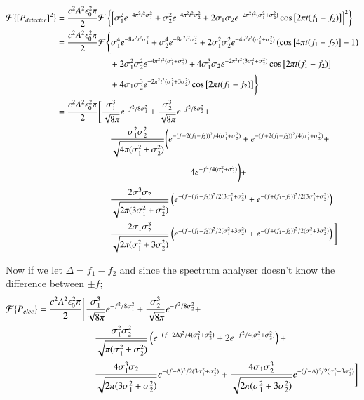 \begin{align}
\mathcal{F}\{\left[P_{detector}\right]^2\} &= \frac{c^2A^2\epsilon_0^2 \pi}{2}\mathcal{F}\left\{\left[\sigma_1^2 e^{-4\pi^2t^2\sigma_1^2} + \sigma_2^2 e^{-4\pi^2t^2\sigma_2^2} + 2\sigma_1\sigma_2 e^{-2\pi^2t^2(\sigma_1^2+\sigma_2^2)}\cos\big[2\pi t (f_1-f_2)\big] \right]^2\right\}\notag\\
&= \frac{c^2A^2\epsilon_0^2 \pi}{2}\mathcal{F}\Bigg\{\sigma_1^4 e^{-8\pi^2t^2\sigma_1^2} + \sigma_2^4 e^{-8\pi^2t^2\sigma_2^2} + 2\sigma_1^2\sigma_2^2 e^{-4\pi^2t^2(\sigma_1^2+\sigma_2^2)}\left(\cos\big[4\pi t (f_1-f_2)\big]+1\right)\notag\\
&\quad\quad\quad\quad\quad\quad + 2\sigma_1^2\sigma_2^2 e^{-4\pi^2t^2(\sigma_1^2+\sigma_2^2)} + 4\sigma_1^3\sigma_2 e^{-2\pi^2t^2(3\sigma_1^2+\sigma_2^2)}\cos\big[2\pi t (f_1-f_2)\big] \notag\\
&\quad\quad\quad\quad\quad\quad + 4\sigma_1\sigma_2^3e^{-2\pi^2t^2(\sigma_1^2+3\sigma_2^2)}\cos\big[2\pi t (f_1-f_2)\big] \Bigg\}\notag\\
&= \frac{c^2A^2\epsilon_0^2 \pi}{2}\Bigg[\frac{\sigma_1^3}{\sqrt{8\pi}} e^{-f^2/8\sigma_1^2} + \frac{\sigma_2^3}{\sqrt{8\pi}} e^{-f^2/8\sigma_2^2} + \notag\\
&\quad\quad\quad\quad\quad\quad \frac{\sigma_1^2\sigma_2^2}{\sqrt{4\pi(\sigma_1^2+\sigma_2^2)}}\Bigg(e^{-(f-2(f_1-f_2))^2/4(\sigma_1^2+\sigma_2^2)} + e^{-(f+2(f_1-f_2))^2/4(\sigma_1^2+\sigma_2^2)}+\notag\\
&\quad\quad\quad\quad\quad\quad  \quad\quad\quad\quad\quad\quad\quad\quad\quad 4e^{-f^2/4(\sigma_1^2+\sigma_2^2)} \Bigg) +\notag\\
&\quad\quad\quad\quad\quad\quad  \frac{2\sigma_1^3\sigma_2}{\sqrt{2\pi(3\sigma_1^2+\sigma_2^2)}}\left(e^{-(f-(f_1-f_2))^2/2(3\sigma_1^2+\sigma_2^2)}+e^{-(f+(f_1-f_2))^2/2(3\sigma_1^2+\sigma_2^2)}\right)\notag\\
&\quad\quad\quad\quad\quad\quad  \frac{2\sigma_1\sigma_2^3}{\sqrt{2\pi(\sigma_1^2+3\sigma_2^2)}}\left(e^{-(f-(f_1-f_2))^2/2(\sigma_1^2+3\sigma_2^2)}+e^{-(f+(f_1-f_2))^2/2(\sigma_1^2+3\sigma_2^2)}\right)\Bigg]
\end{align}

Now if we let $\Delta=f_1-f_2$ and since the spectrum analyser doesn't know the difference between $\pm f$;
\begin{align}
\mathcal{F}\{P_{elec}\} &= \frac{c^2A^2\epsilon_0^2 \pi}{2}\Bigg[\frac{\sigma_1^3}{\sqrt{8\pi}} e^{-f^2/8\sigma_1^2} + \frac{\sigma_2^3}{\sqrt{8\pi}} e^{-f^2/8\sigma_2^2} + \notag\\
&\quad\quad\quad\quad\quad\quad \frac{\sigma_1^2\sigma_2^2}{\sqrt{\pi(\sigma_1^2+\sigma_2^2)}}\left(e^{-(f-2\Delta)^2/4(\sigma_1^2+\sigma_2^2)} + 2e^{-f^2/4(\sigma_1^2+\sigma_2^2)} \right) +\notag\\
&\quad\quad\quad\quad\quad\quad  \frac{4\sigma_1^3\sigma_2}{\sqrt{2\pi(3\sigma_1^2+\sigma_2^2)}}e^{-(f-\Delta)^2/2(3\sigma_1^2+\sigma_2^2)}+\frac{4\sigma_1\sigma_2^3}{\sqrt{2\pi(\sigma_1^2+3\sigma_2^2)}}e^{-(f-\Delta)^2/2(\sigma_1^2+3\sigma_2^2)}\Bigg]
\end{align}


